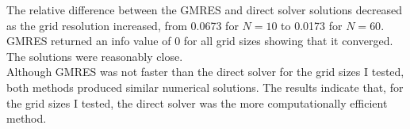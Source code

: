 \documentclass[11pt]{article}
\begin{document}
The relative difference between the GMRES and direct solver solutions decreased as the grid resolution increased, from 0.0673 for $N=10$ to 0.0173 for $N=60$. GMRES returned an info value of 0 for all grid sizes showing that it converged. The solutions were reasonably close. \\

Although GMRES was not faster than the direct solver for the grid sizes I tested, both methods produced similar numerical solutions. The results indicate that, for the grid sizes I tested, the direct solver was the more computationally efficient method.
\end{document}
